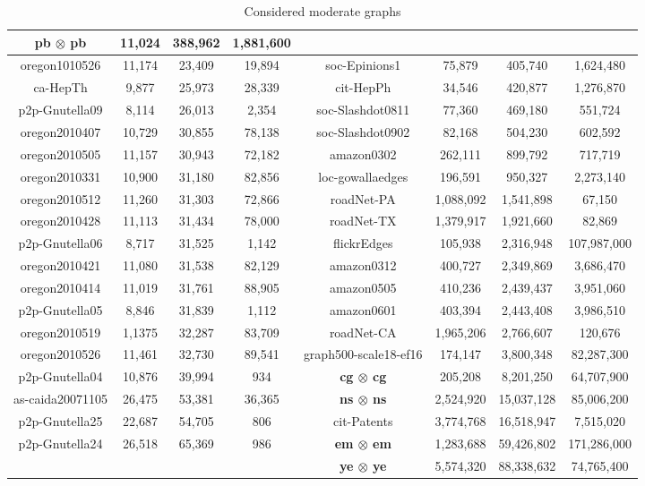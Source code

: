 \documentclass[10]{report}
\begin{document}
\begin{table}[htbp]
\begin{center}
\begin{tabular}{|c|c|c|c|c|c|c|c|}
\textbf{pb $\boldsymbol{\otimes}$ pb} & 11,024 & 388,962 & 1,881,600 \\
\hline
oregon1010526 & 11,174 & 23,409 & 19,894 & 
soc-Epinions1 & 75,879 & 405,740 & 1,624,480 \\
\hline
ca-HepTh & 9,877 & 25,973 & 28,339 & 
cit-HepPh & 34,546 & 420,877 & 1,276,870 \\
\hline
p2p-Gnutella09 & 8,114 & 26,013 & 2,354 & 
soc-Slashdot0811 & 77,360 & 469,180 & 551,724 \\
\hline
oregon2010407 & 10,729 & 30,855 & 78,138 & 
soc-Slashdot0902 & 82,168 & 504,230 & 602,592 \\
\hline
oregon2010505 & 11,157 & 30,943 & 72,182 & 
amazon0302 & 262,111 & 899,792 & 717,719 \\
\hline
oregon2010331 & 10,900 & 31,180 & 82,856 & 
loc-gowallaedges & 196,591 & 950,327 & 2,273,140 \\
\hline
oregon2010512 & 11,260 & 31,303 & 72,866 & 
roadNet-PA & 1,088,092 & 1,541,898 & 67,150 \\
\hline
oregon2010428 & 11,113 & 31,434 & 78,000 & 
roadNet-TX & 1,379,917 & 1,921,660 & 82,869 \\
\hline
p2p-Gnutella06 & 8,717 & 31,525 & 1,142 & 
flickrEdges & 105,938 & 2,316,948 & 107,987,000 \\
\hline
oregon2010421 & 11,080 & 31,538 & 82,129 & 
amazon0312 & 400,727 & 2,349,869 & 3,686,470 \\
\hline
oregon2010414 & 11,019 & 31,761 & 88,905 & 
amazon0505 & 410,236 & 2,439,437 & 3,951,060 \\
\hline
p2p-Gnutella05 & 8,846 & 31,839 & 1,112 & 
amazon0601 & 403,394 & 2,443,408 & 3,986,510 \\
\hline
oregon2010519 & 1,1375 & 32,287 & 83,709 & 
roadNet-CA & 1,965,206 & 2,766,607 & 120,676 \\
\hline
oregon2010526 & 11,461 & 32,730 & 89,541 & 
graph500-scale18-ef16 & 174,147 & 3,800,348 & 82,287,300 \\
\hline
p2p-Gnutella04 & 10,876 & 39,994 & 934 & 
\textbf{cg $\boldsymbol{\otimes}$ cg} & 205,208 & 8,201,250 & 64,707,900 \\
\hline
as-caida20071105 & 26,475 & 53,381 & 36,365 & 
\textbf{ns $\boldsymbol{\otimes}$ ns} & 2,524,920 & 15,037,128 & 85,006,200 \\
\hline
p2p-Gnutella25 & 22,687 & 54,705 & 806 & 
cit-Patents & 3,774,768 & 16,518,947 & 7,515,020 \\
\hline
p2p-Gnutella24 & 26,518 & 65,369 & 986 & 
\textbf{em $\boldsymbol{\otimes}$ em} & 1,283,688 & 59,426,802 & 171,286,000 \\
\hline
& & & & \textbf{ye $\boldsymbol{\otimes}$ ye} & 5,574,320 & 88,338,632 & 74,765,400 \\
\hline
\end{tabular}
\end{center}
\caption{Considered moderate graphs \label{tab:graphs}}
\end{table}
\end{document}
